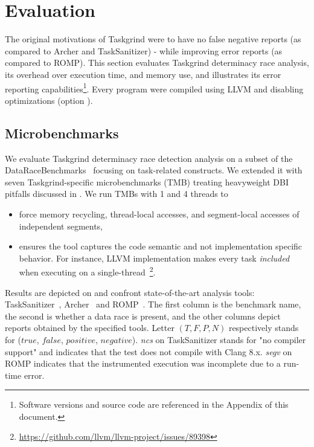 \section{Evaluation} \label{sec:eval}

The original motivations of Taskgrind were to have no false negative reports (as compared to Archer and TaskSanitizer) - while improving error reports (as compared to ROMP).
This section evaluates Taskgrind determinacy race analysis, its overhead over execution time, and memory use, and illustrates its error reporting capabilities\footnote{Software versions and source code are referenced in the Appendix of this document.}.
Every program were compiled using LLVM and disabling optimizations (option ).

\subsection{Microbenchmarks}
We evaluate Taskgrind determinacy race detection analysis on a subset of the DataRaceBenchmarks~\cite{drb} focusing on task-related constructs.
We extended it with seven Taskgrind-specific microbenchmarks (TMB) treating heavyweight DBI pitfalls discussed in .
We run TMBs with 1 and 4 threads to
\begin{itemize}
	\item	force memory recycling, thread-local accesses, and segment-local accesses of independent segments,
	\item 	ensures the tool captures the code semantic and not implementation specific behavior.
	For instance, LLVM implementation makes every task \emph{included} when executing on a single-thread~\footnote{\url{https://github.com/llvm/llvm-project/issues/89398}}.
\end{itemize}
Results are depicted on  and confront state-of-the-art analysis tools: TaskSanitizer~\cite{Matar18}, Archer~\cite{archer} and ROMP~\cite{ROMP}.
The first column is the benchmark name, the second is whether a data race is present, and the other columns depict reports obtained by the specified tools.
Letter $(T, F, P, N)$ respectively stands for ($true$, $false$, $positive$, $negative$).
\emph{ncs} on TaskSanitizer stands for "no compiler support" and indicates that the test does not compile with Clang 8.x.
\emph{segv} on ROMP indicates that the instrumented execution was incomplete due to a run-time error.

